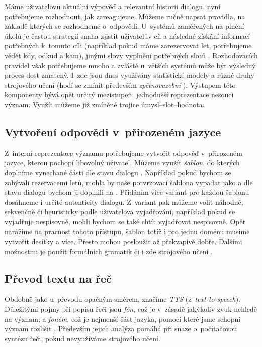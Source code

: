 Máme uživatelovu aktuální výpověď a relevantní historii dialogu, nyní potřebujeme
rozhodnout, jak zareagujeme. Můžeme ručně napsat pravidla, na základě kterých
se rozhodneme o~odpovědi. U~systémů zaměřených na plnění úkolů je častou
strategií snaha zjistit uživatelův cíl a následné získání informací potřebných
k~tomuto cíli (například pokud máme zarezervovat let, potřebujeme vědět kdy,
odkud a kam), jinými slovy vyplnění potřebných slotů \citep[strany 504-506]{jurafsky_slp_2020}. Rozhodovacích pravidel
však potřebujeme mnoho a zvláště u~větších systémů může být výsledný proces dost
zmatený. I~zde jsou dnes využívány statistické modely a různé druhy strojového
učení (hodí se zmínit především \textit{zpětnovazební} \citep{su_reward_2015}). Výstupem této komponenty
bývá opět určitý mezistupeň, jednodušší reprezentace nesoucí význam. Využít
můžeme již zmíněné trojice úmysl--slot--hodnota.

\subsection{Vytvoření odpovědi v~přirozeném jazyce}\label{nlg}

Z~interní reprezentace významu potřebujeme vytvořit odpověď v~přirozeném
jazyce, kterou pochopí libovolný uživatel. Můžeme využít \textit{šablon}, do
kterých doplníme vynechané části dle stavu dialogu \citep[strana 508]{jurafsky_slp_2020}. Například pokud bychom
se zabývali rezervacemi letů, mohla by naše potvrzovací šablona vypadat jako
 a dle stavu dialogu
bychom ji doplnili na .
Přidáním více variant pro každou šablonu dosáhneme i určité autenticity dialogu.
Z~variant pak můžeme volit náhodně, sekvenčně či heuristicky podle uživatelova
vyjadřování, například pokud se vyjadřuje nespisovně, mohli bychom se také
chtít vyjadřovat nespisovně. Opět narážíme na pracnost tohoto přístupu, šablon
totiž i pro jednu doménu musíme vytvořit desítky a více. Přesto mohou
posloužit až překvapivě dobře. Dalšími možnostmi je použít formálních gramatik
\citep{teich_grammars_1999} či i zde strojového učení \citep{wen_stochastic_2015}.

\subsection{Převod textu na řeč}\label{tts}

Obdobně jako u~převodu opačným směrem, značíme \textit{TTS} (z~\textit{text-to-speech}).
Důležitými pojmy
při popisu řeči jsou \textit{fón}, což je v~zásadě jakýkoliv zvuk nehledě na
význam; a \textit{foném}, což je nejmenší část jazyka,
pomocí které jsme schopni význam rozlišit \citep[kapitola 1]{li2020universal}. Především jejich analýza pomáhá
při snaze o~počítačovou syntézu řeči, pokud nevyužíváme strojového učení.


